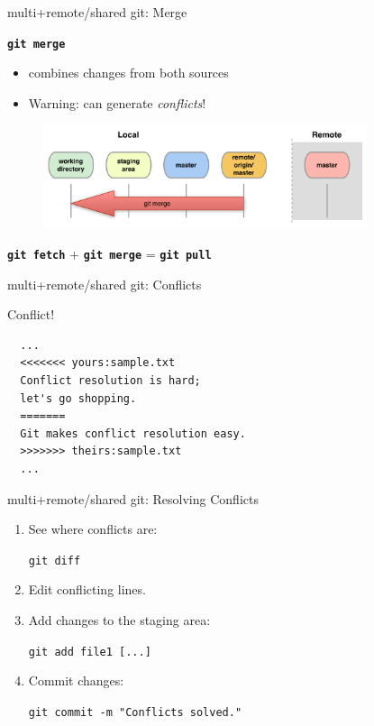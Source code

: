 \documentclass{beamer}
\newcommand{\git}{git\xspace}
\begin{document}
\begin{frame}{multi+remote/shared \git: Merge}
  \begin{center}
    \texttt{\textbf{git merge}}
  \end{center}
  \begin{itemize}
  \item combines changes from both sources
  \item \alert{Warning}: can generate \emph{conflicts}!
  \end{itemize}
  \begin{figure}
    \centering
    \includegraphics[width=9.5cm]{figs/local-remote-merge}
  \end{figure}
  \begin{center}
    \texttt{\textbf{git fetch}} + \texttt{\textbf{git merge}} = \texttt{\textbf{git pull}}
  \end{center}
\end{frame}


\begin{frame}[fragile]{multi+remote/shared \git: Conflicts}
  \begin{center}
    \alert{Conflict!}
  \end{center}
\begin{verbatim}
  ...
  <<<<<<< yours:sample.txt
  Conflict resolution is hard;
  let's go shopping.
  =======
  Git makes conflict resolution easy.
  >>>>>>> theirs:sample.txt
  ...
\end{verbatim}
\end{frame}


\begin{frame}{multi+remote/shared \git: Resolving Conflicts}
\begin{enumerate}
\item See where conflicts are:
  \begin{center}
  \texttt{git diff}
  \end{center}
\item Edit conflicting lines.
\item Add changes to the staging area:
  \begin{center}
    \texttt{git add file1 [...]}
  \end{center}
\item Commit changes:
  \begin{center}
    \texttt{git commit -m "Conflicts solved."}
  \end{center}
\end{enumerate}
\end{frame}
\end{document}
